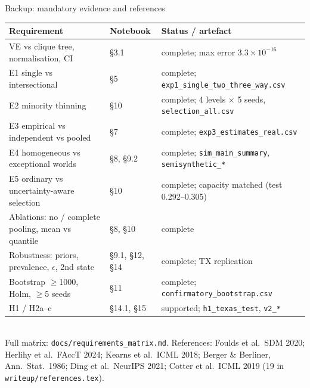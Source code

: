 \documentclass[aspectratio=169,11pt]{beamer}
\begin{document}
\appendix
\begin{frame}{Backup: mandatory evidence and references}
\scriptsize
\begin{tabularx}{\linewidth}{@{}ll>{\raggedright\arraybackslash}X@{}}\toprule
Requirement & Notebook & Status / artefact\\\midrule
VE vs clique tree, normalisation, CI & \S3.1 & complete; max error $3.3\times10^{-16}$\\
E1 single vs intersectional & \S5 & complete; \texttt{exp1\_single\_two\_three\_way.csv}\\
E2 minority thinning & \S10 & complete; 4 levels $\times$ 5 seeds, \texttt{selection\_all.csv}\\
E3 empirical vs independent vs pooled & \S7 & complete; \texttt{exp3\_estimates\_real.csv}\\
E4 homogeneous vs exceptional worlds & \S8, \S9.2 & complete; \texttt{sim\_main\_summary}, \texttt{semisynthetic\_*}\\
E5 ordinary vs uncertainty-aware selection & \S10 & complete; capacity matched (test 0.292--0.305)\\
Ablations: no / complete pooling, mean vs quantile & \S8, \S10 & complete\\
Robustness: priors, prevalence, $\epsilon$, 2nd state & \S9.1, \S12, \S14 & complete; TX replication\\
Bootstrap $\ge$1000, Holm, $\ge$5 seeds & \S11 & complete; \texttt{confirmatory\_bootstrap.csv}\\
H1 / H2a--c & \S14.1, \S15 & supported; \texttt{h1\_texas\_test}, \texttt{v2\_*}\\\bottomrule
\end{tabularx}\\[4pt]
Full matrix: \texttt{docs/requirements\_matrix.md}. References: Foulds et al.\ SDM 2020; Herlihy et al.\ FAccT 2024;
Kearns et al.\ ICML 2018; Berger \& Berliner, Ann.\ Stat.\ 1986; Ding et al.\ NeurIPS 2021; Cotter et al.\ ICML 2019
(19 in \texttt{writeup/references.tex}).
\end{frame}
\end{document}
